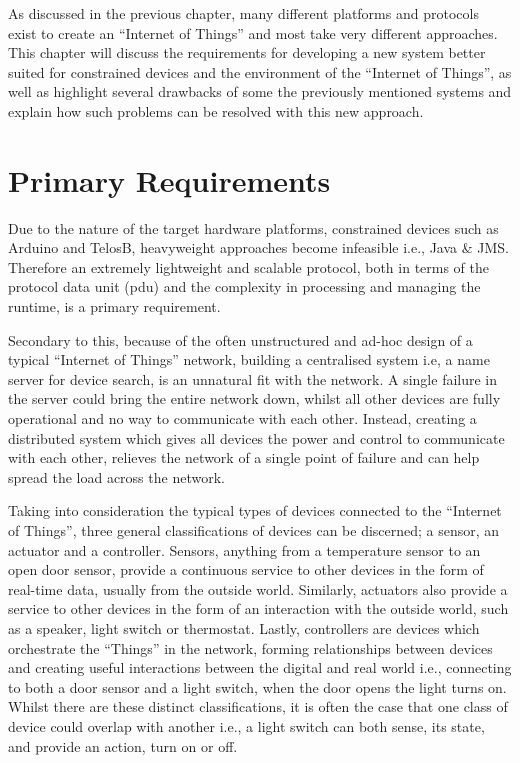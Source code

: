  

As discussed in the previous chapter, many different platforms and protocols exist to create an ``Internet of Things'' and most take very different approaches. This chapter will discuss the requirements for developing a new system better suited for constrained devices and the environment of the ``Internet of Things'', as well as highlight several drawbacks of some the previously mentioned systems and explain how such problems can be resolved with this new approach.

\section{Primary Requirements}
\label{sec:primary_requirements}
Due to the nature of the target hardware platforms, constrained devices such as Arduino and TelosB, heavyweight approaches become infeasible i.e., Java \& JMS. Therefore an extremely lightweight and scalable protocol, both in terms of the protocol data unit (pdu) and the complexity in processing and managing the runtime, is a primary requirement.

Secondary to this, because of the often unstructured and ad-hoc design of a typical ``Internet of Things'' network, building a centralised system i.e, a name server for device search, is an unnatural fit with the network. A single failure in the server could bring the entire network down, whilst all other devices are fully operational and no way to communicate with each other.
Instead, creating a distributed system which gives all devices the power and control to communicate with each other, relieves the network of a single point of failure and can help spread the load across the network. %

Taking into consideration the typical types of devices connected to the ``Internet of Things'', three general classifications of devices can be discerned; a sensor, an actuator and a controller. Sensors, anything from a temperature sensor to an open door sensor, provide a continuous service to other devices in the form of real-time data, usually from the outside world. Similarly, actuators also provide a service to other devices in the form of an interaction with the outside world, such as a speaker, light switch or thermostat. Lastly, controllers are devices which orchestrate the ``Things'' in the network, forming relationships between devices and creating useful interactions between the digital and real world i.e., connecting to both a door sensor and a light switch, when the door opens the light turns on. Whilst there are these distinct classifications, it is often the case that one class of device could overlap with another i.e., a light switch can both sense, its state, and provide an action, turn on or off.


